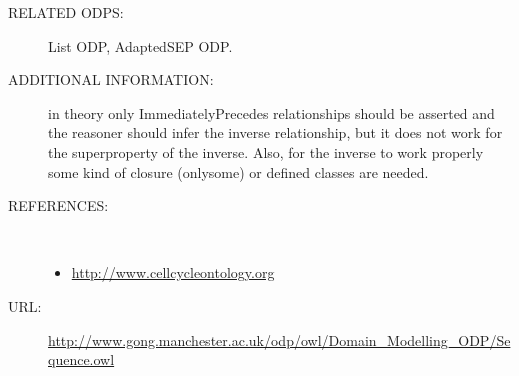 \begin{description}
\item [RELATED ODPS:] List ODP, AdaptedSEP ODP.

\item [ADDITIONAL INFORMATION:] in theory only ImmediatelyPrecedes relationships should be asserted and the reasoner should infer the inverse relationship, but it does not work for the superproperty of the inverse. Also, for the inverse to work properly some kind of closure (onlysome) or defined classes are needed.

\item [REFERENCES: ] ~\begin{itemize}
\item \url{http://www.cellcycleontology.org}\end{itemize}
\item [URL: ] \url{http://www.gong.manchester.ac.uk/odp/owl/Domain_Modelling_ODP/Sequence.owl} \end{description}